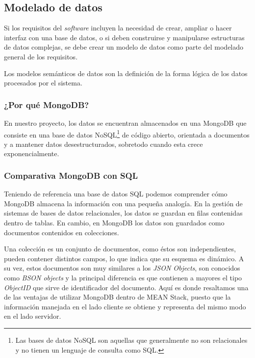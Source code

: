 
\subsection{Modelado de datos}
Si los requisitos del \textit{software} incluyen la necesidad de crear, ampliar o hacer interfaz con una base de datos, o si deben construirse y manipularse estructuras de datos complejas, se debe crear un modelo de datos como parte del modelado general de los requisitos.\cite{pressman}


Los modelos semánticos de datos son la definición de la forma lógica de los datos procesados por el sistema. \cite{sommerville}


\subsubsection{¿Por qué MongoDB?}
En nuestro proyecto, los datos se encuentran almacenados en una MongoDB que consiste en una base de datos NoSQL\footnote{Las bases de datos NoSQL son aquellas que generalmente no son relacionales y no tienen un lenguaje de consulta como SQL.} de código abierto, orientada a documentos y a mantener datos desestructurados, sobretodo cuando esta crece exponencialmente. \cite{mongodb_traspas}

\subsubsection{Comparativa MongoDB con SQL}
Teniendo de referencia una base de datos SQL podemos comprender cómo MongoDB almacena la información con una pequeña analogía. En la gestión de sistemas de bases de datos relacionales, los datos se guardan en filas contenidas dentro de tablas. En cambio, en MongoDB los datos son guardados como documentos contenidos en colecciones.


Una colección es un conjunto de documentos, como éstos son independientes, pueden contener distintos campos, lo que indica que su esquema es dinámico. A su vez, estos documentos son muy similares a los \textit{JSON Objects}, son conocidos como \textit{BSON objects} y la principal diferencia es que contienen a mayores el tipo \textit{ObjectID} que sirve de identificador del documento. Aquí es donde resaltamos una de las ventajas de utilizar MongoDB dentro de MEAN Stack, puesto que la información manejada en el lado cliente se obtiene y representa del mismo modo en el lado servidor.


